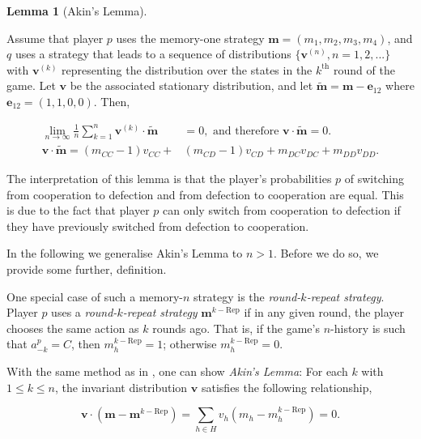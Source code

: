 \documentclass{article}
\theoremstyle{definition}
\newtheorem{lemma}[theorem]{Lemma}
\begin{document}
\begin{lemma}[Akin's Lemma]\label{lemma:akin}

Assume that player \(p\) uses the memory-one strategy \(\mathbf{m}=(m_1, m_2,
m_3, m_4)\), and \(q\) uses a strategy that leads to a sequence of distributions
\(\{\mathbf{v}^{(n)}, n = 1, 2, ...\}\) with \(\mathbf{v}^{(k)}\) representing
the distribution over the states in the \(k^{\text{th}}\) round of the game. Let
\(\mathbf{v}\) be the associated stationary distribution, and let
\(\mathbf{\tilde{m}} = \mathbf{m} - \mathbf{e}_{12}\) where \(\mathbf{e}_{12} =
(1, 1, 0, 0)\). Then,
  
    \begin{align}
      \lim_{n \rightarrow \infty} \frac{1}{n} \sum_{k=1}^{n} \mathbf{v}^{(k)} \cdot \mathbf{\tilde{m}} & = 0, \text{ and therefore } \mathbf{v} \cdot \mathbf{\tilde{m}} = 0. \\
      \mathbf{v} \cdot \mathbf{\tilde{m}} = (m_{CC} - 1) v_{CC} + & (m_{CD} - 1) v_{CD} + m_{DC} v_{DC} + m_{DD} v_{DD}.
    \end{align}
\end{lemma}

The interpretation of this lemma is that the player's probabilities $p$ of
switching from cooperation to defection and from defection to cooperation are
equal. This is due to the fact that player $p$ can only switch from cooperation
to defection if they have previously switched from defection to cooperation.

In the following we generalise Akin's Lemma to $n>1$. Before we do so, we provide
some further, definition.

One special case of such a memory-$n$ strategy is the  {\it round-$k$-repeat
strategy}. Player $p$ uses a {\it round-$k$-repeat strategy}
$\mathbf{m}^{k-\text{Rep}}$ if in any given round, the player chooses the same
action as $k$ rounds ago. That is, if the game's $n$-history is such that
$a^p_{-k}\!=\!C$, then $m^{k-\text{Rep}}_h\!=\!1$; otherwise
$m^{k-\text{Rep}}_h\!=\!0$.

With the same method as in \citep{akin:EGADS:2016}, one can show {\it Akin's
Lemma}: For each $k$ with $1\!\le\!k\!\le\!n$, the invariant distribution
$\mathbf{v}$ satisfies the following relationship,

\begin{equation} \label{Eq:AkinsLemma}
\mathbf{v} \cdot (\mathbf{m}-\mathbf{m}^{k-\text{Rep}}) \!=\! \sum_{h\in H} v_h (m_h-m_h^{k-\text{Rep}}) = 0.
\end{equation}
\end{document}
